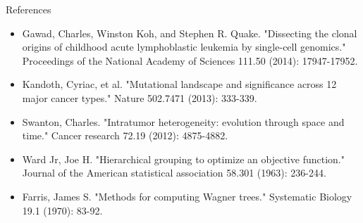 \documentclass[pdf, aspectratio=169]{beamer}
\begin{document}
\begin{frame}{References}
	\begin{itemize}
		\item Gawad, Charles, Winston Koh, and Stephen R. Quake. "Dissecting the clonal origins of childhood acute lymphoblastic leukemia by single-cell genomics." Proceedings of the National Academy of Sciences 111.50 (2014): 17947-17952.
		\item Kandoth, Cyriac, et al. "Mutational landscape and significance across 12 major cancer types." Nature 502.7471 (2013): 333-339.
		\item Swanton, Charles. "Intratumor heterogeneity: evolution through space and time." Cancer research 72.19 (2012): 4875-4882.
		\item Ward Jr, Joe H. "Hierarchical grouping to optimize an objective function." Journal of the American statistical association 58.301 (1963): 236-244.
		\item Farris, James S. "Methods for computing Wagner trees." Systematic Biology 19.1 (1970): 83-92.
	\end{itemize}
\end{frame}
\end{document}
